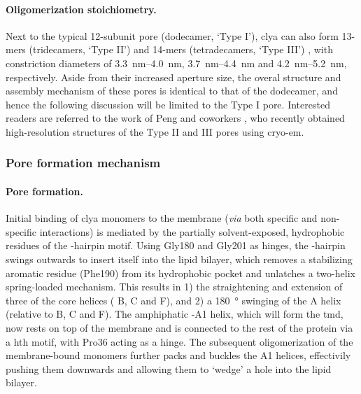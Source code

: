 \paragraph{Oligomerization stoichiometry.}
%
Next to the typical 12-subunit pore (dodecamer, `Type I'), \gls{clya} can also form 13-mers (tridecamers,
`Type II') and 14-mers (tetradecamers, `Type III') \cite{Soskine-2013,Peng-2019}, with constriction diameters
of \SIrange{3.3}{4.0}{\nm}, \SIrange{3.7}{4.4}{\nm} and \SIrange{4.2}{5.2}{\nm}, respectively. Aside from
their increased aperture size, the overal structure and assembly mechanism of these pores is identical to that
of the dodecamer, and hence the following discussion will be limited to the Type I pore. Interested readers
are referred to the work of Peng and coworkers \cite{Peng-2019}, who recently obtained high-resolution
structures of the Type II and III pores using \gls{cryo-em}.

\subsubsection{Pore formation mechanism}

\paragraph{Pore formation.}
%
Initial binding of \gls{clya} monomers to the membrane (\textit{via} both specific and non-specific
interactions) is mediated by the partially solvent-exposed, hydrophobic residues of the \tb-hairpin motif.
Using Gly180 and Gly201 as hinges, the \tb-hairpin swings outwards to insert itself into the lipid bilayer,
which removes a stabilizing aromatic residue (Phe190) from its hydrophobic pocket and unlatches a two-helix
spring-loaded mechanism. This results in 1) the straightening and extension of three of the core helices (\ta
B, \ta C and \ta F), and 2) a \SI{180}{\degree} swinging of the \ta A helix (relative to \ta B, \ta C and \ta
F). The amphiphatic \ta-A1 helix, which will form the \gls{tmd}, now rests on top of the membrane and is
connected to the rest of the protein via a \gls{hth} motif, with Pro36 acting as a hinge. The
subsequent oligomerization of the membrane-bound monomers further packs and buckles the \ta A1 helices,
effectivily pushing them downwards and allowing them to `wedge' a hole into the lipid bilayer.

